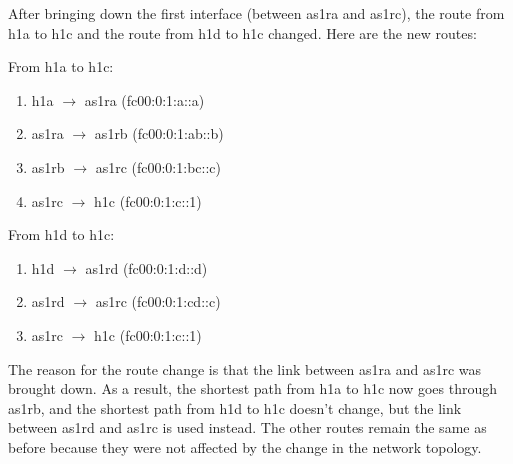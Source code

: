 After bringing down the first interface (between as1ra and as1rc), the route from h1a to h1c and the route from h1d to h1c changed. Here are the new routes:

From h1a to h1c:
\begin{enumerate}[label=\arabic*.]
    \item h1a $\to$ as1ra (fc00:0:1:a::a)
    \item as1ra $\to$ as1rb (fc00:0:1:ab::b)
    \item as1rb $\to$ as1rc (fc00:0:1:bc::c)
    \item as1rc $\to$ h1c (fc00:0:1:c::1)
\end{enumerate}

From h1d to h1c:
\begin{enumerate}[label=\arabic*.]
    \item h1d $\to$ as1rd (fc00:0:1:d::d)
    \item as1rd $\to$ as1rc (fc00:0:1:cd::c)
    \item as1rc $\to$ h1c (fc00:0:1:c::1)
\end{enumerate}

The reason for the route change is that the link between as1ra and as1rc was brought down. As a result, the shortest path from h1a to h1c now goes through as1rb, and the shortest path from h1d to h1c doesn't change, but the link between as1rd and as1rc is used instead. The other routes remain the same as before because they were not affected by the change in the network topology.